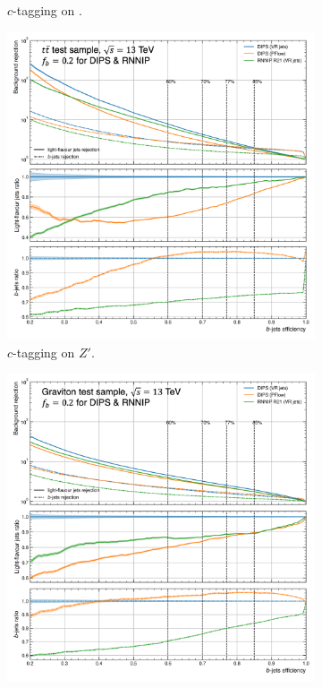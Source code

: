 \begin{figure}
\begin{subfigure}[t]{0.32\textwidth}
      \caption{$c$-tagging on \ttb.}
      \label{fig:dipsVRROCttc}
    \end{subfigure}
    \hfill
    \begin{subfigure}[t]{0.32\textwidth}
      \centering
      \includegraphics[width=\textwidth]{Images/FTAG/VRDips/ROC/zpc.png}
      \caption{$c$-tagging on $Z'$.}
      \label{fig:dipsVRROCzpc}
    \end{subfigure}
    \hfill
    \begin{subfigure}[t]{0.32\textwidth}
      \centering
      \includegraphics[width=\textwidth]{Images/FTAG/VRDips/ROC/grc.png}

\end{subfigure}
\end{figure}
